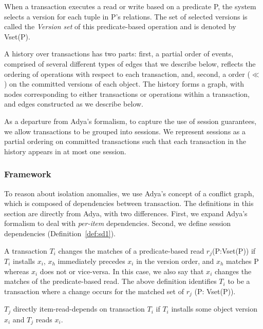 \begin{definition}
When a transaction executes a read or write based on a predicate P,
the system selects a version for each tuple in P’s relations. The set
of selected versions is called the \textit{Version set} of this predicate-based
operation and is denoted by Vset(P).
\end{definition}

A history over transactions has two parts: first, a partial order of
events, comprised of several different types of edges that we describe
below, reflects the ordering of operations with respect to each
transaction, and, second, a order ($\ll$) on the committed versions of
each object. The history forms a graph, with nodes corresponding to
either transactions or operations within a transaction, and edges
constructed as we describe below.

As a departure from Adya's formalism, to capture the use of session
guarantees, we allow transactions to be grouped into sessions. We
represent sessions as a partial ordering on committed transactions
such that each transaction in the history appears in at most one
session.

\subsubsection{Framework}

To reason about isolation anomalies, we use Adya's concept of a
conflict graph, which is composed of dependencies between
transaction. The definitions in this section are directly from Adya,
with two differences. First, we expand Adya's formalism to deal
with \textit{per-item} dependencies. Second, we define session
dependencies (Definition~\ref{def:sd1}).

\begin{definition}
A transaction $T_i$ changes the matches
of a predicate-based read $r_j$(P:Vset(P)) if $T_i$ installs $x_i$, $x_h$
immediately precedes $x_i$ in the version order, and $x_h$ matches
P whereas $x_i$ does not or vice-versa. In this case, we also
say that $x_i$ changes the matches of the predicate-based read.
The above definition identifies $T_i$ to be a transaction where
a change occurs for the matched set of $r_j$ (P: Vset(P)).
\end{definition}

\begin{definition}
$T_j$ directly item-read-depends on transaction $T_i$ if $T_i$ installs some
  object version $x_i$ and $T_j$ reads $x_i$.
\end{definition}

